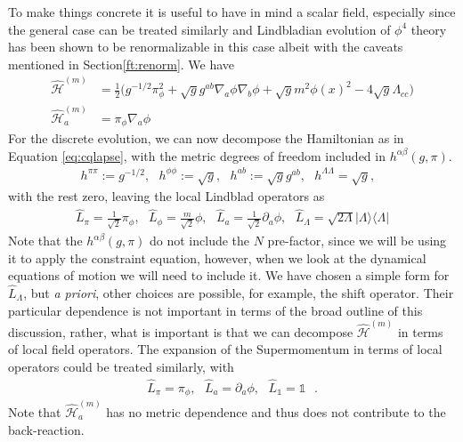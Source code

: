 \documentclass[aps,pra,showpacs,citeautoscript,amsmath,amssymb,floatfix,superscriptaddress,bbm, verbatim,amsfonts,changes,10pt,nofootinbib,longbibliography]{revtex4-1}
\newcommand{\id}{\mathbb{1}}
\newcommand{\proj}[1]{|#1\rangle\!\langle#1|}
\def\s{\,\,\,\,}
\def\L{{\hat{L}}}
\def\gfdet{\sqrt{g}}
\def\qham{\hat{\mathcal H}^{(m)}} %
\def\qmom{\hat{\mathcal{H}}^{(m)}}
\def\ab{^{\alpha\beta}}
\def\gpi{(g,\pi)}
\def\xd{}%
\begin{document}
To make things concrete it is useful to have in mind a scalar field, especially since the general case can be treated similarly and Lindbladian evolution of $\phi^4$ theory has been shown to be renormalizable in this case\cite{baidya2017renormalization}\label{par:caveats} albeit with the caveats mentioned in Section\ref{ft:renorm}. %
We have\cite{smear_foot}
\begin{align}
\qham
&=\frac{1}{2}\Big({g}^{-1/2}\pi_\phi^2+\sqrt{g}g^{ab}\nabla_a\phi\nabla_b\phi+\sqrt{g}m^2\phi(x)^2
-4\sqrt{g}\Lambda_{cc}\Big)
\label{eq:scalarTNN}\\
\qmom_a
&=\pi_\phi\nabla_a\phi
\end{align}
For the discrete evolution, we can now decompose the Hamiltonian as in Equation \eqref{eq:cqlapse}, with the metric degrees of freedom included in
$h\ab\gpi$. 
\begin{align}
h^{\pi\pi}:= 
g^{-1/2}, \s
h^{\phi\phi}:= 
\gfdet,\s
h^{ab}:=\gfdet g^{ab}
,\s
h^{\Lambda\Lambda}=\sqrt{g}
,\s
\label{eq:hlapse}
\end{align} 
with the rest zero, leaving the local Lindblad operators as
\begin{align}
\L_\pi\xd=\frac{1}{\sqrt{2}}\pi_\phi\xd,\s
\L_\phi\xd=\frac{m}{\sqrt{2}}\phi\xd, 
\s \L_a\xd=\frac{1}{\sqrt{2}}\partial_a\phi\xd
,\s %
\L_{\Lambda}={\sqrt{2\Lambda}}\proj{\Lambda}
\label{eq:scalarL}
\end{align}
Note that the $h\ab\gpi$ do not include the $N$ pre-factor, since we will be using it to apply the constraint equation, however, when we look at the dynamical equations of motion we will need to include it. We have chosen a simple form for $\L_{\Lambda}$, but {\it a priori}, other choices are possible, for example, the shift operator.
Their particular dependence is not important in terms of the broad outline of this discussion, rather, what is important is that we can decompose 
$\qham\xd$
in terms of local field operators. The expansion of the Supermomentum in terms of local operators could be treated similarly, 
with 
\begin{align}
\L_{\pi}\xd=\pi_\phi\xd,\s \L_{a}\xd=\partial_a\phi\xd
,\s \L_\id=\id\s.
\end{align}
Note that $\qmom_a\xd$ has no metric dependence and thus does not contribute to the back-reaction.%
\end{document}
